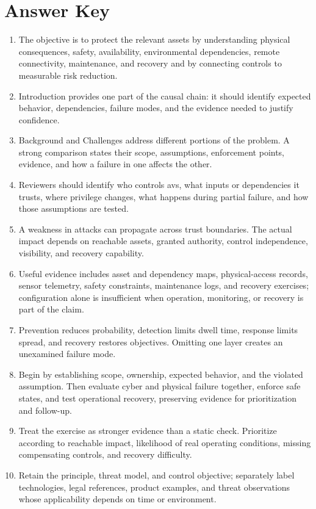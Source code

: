 \documentclass[11pt,letterpaper]{article}
\begin{document}
\section*{Answer Key}
\begin{enumerate}
\item The objective is to protect the relevant assets by understanding physical consequences, safety, availability, environmental dependencies, remote connectivity, maintenance, and recovery and by connecting controls to measurable risk reduction.
\item Introduction provides one part of the causal chain: it should identify expected behavior, dependencies, failure modes, and the evidence needed to justify confidence.
\item Background and Challenges address different portions of the problem. A strong comparison states their scope, assumptions, enforcement points, evidence, and how a failure in one affects the other.
\item Reviewers should identify who controls avs, what inputs or dependencies it trusts, where privilege changes, what happens during partial failure, and how those assumptions are tested.
\item A weakness in attacks can propagate across trust boundaries. The actual impact depends on reachable assets, granted authority, control independence, visibility, and recovery capability.
\item Useful evidence includes asset and dependency maps, physical-access records, sensor telemetry, safety constraints, maintenance logs, and recovery exercises; configuration alone is insufficient when operation, monitoring, or recovery is part of the claim.
\item Prevention reduces probability, detection limits dwell time, response limits spread, and recovery restores objectives. Omitting one layer creates an unexamined failure mode.
\item Begin by establishing scope, ownership, expected behavior, and the violated assumption. Then evaluate cyber and physical failure together, enforce safe states, and test operational recovery, preserving evidence for prioritization and follow-up.
\item Treat the exercise as stronger evidence than a static check. Prioritize according to reachable impact, likelihood of real operating conditions, missing compensating controls, and recovery difficulty.
\item Retain the principle, threat model, and control objective; separately label technologies, legal references, product examples, and threat observations whose applicability depends on time or environment.
\end{enumerate}
\end{document}
